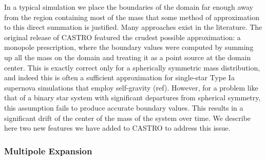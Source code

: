 \documentclass[12pt,preprint]{aastex}
\begin{document}
In a typical simulation we place the boundaries of the domain far enough away from the region containing most of the mass that some method of approximation to this direct summation is justified. Many approaches exist in the literature. The original release of CASTRO featured the crudest possible approximation: a monopole prescription, where the boundary values were computed by summing up all the mass on the domain and treating it as a point source at the domain center. This is exactly correct only for a spherically symmetric mass distribution, and indeed this is often a sufficient approximation for single-star Type Ia supernova simulations that employ self-gravity (ref). However, for a problem like that of a binary star system with significant departures from spherical symmetry, this assumption fails to produce accurate boundary values. This results in a significant drift of the center of the mass of the system over time. We describe here two new features we have added to CASTRO to address this issue.

\subsubsection{Multipole Expansion}
\end{document}
